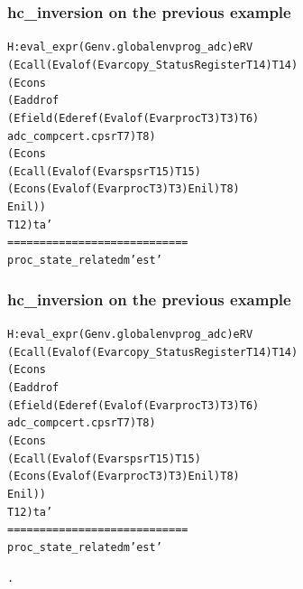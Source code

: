 \documentclass[usenames,dvipsnames]{beamer} %
\begin{document}
\begin{frame}[fragile]
\frametitle{hc\_inversion on the previous example}
\small
\begin{alltt}
H:eval_expr (Genv.globalenv prog_adc) e  RV
   (Ecall (Evalof (Evar copy_StatusRegister T14) T14)
      (Econs
         (Eaddrof
            (Efield (Ederef (Evalof (Evar proc T3) T3) T6)
              adc_compcert.cpsr T7) T8)
         (Econs
            (Ecall (Evalof (Evar spsr T15) T15)
               (Econs (Evalof (Evar proc T3) T3) Enil) T8)
                Enil))
      T12) t  a'
============================
   proc_state_related m' e st'
\end{alltt}
\begin{alltt}
\end{alltt}
\end{frame}

\begin{frame}[fragile]
\frametitle{hc\_inversion on the previous example}
\small
\begin{alltt}
H:eval_expr (Genv.globalenv prog_adc) e  RV
   (Ecall (Evalof (Evar copy_StatusRegister T14) T14)
      (Econs
         (Eaddrof
            (Efield (Ederef (Evalof (Evar proc T3) T3) T6)
              adc_compcert.cpsr T7) T8)
         (Econs
            (Ecall (Evalof (Evar spsr T15) T15)
               (Econs (Evalof (Evar proc T3) T3) Enil) T8)
                Enil))
      T12) t  a'
============================
   proc_state_related m' e st'
\end{alltt}
\begin{alltt}
   .
\end{alltt}
\end{frame}
\end{document}
